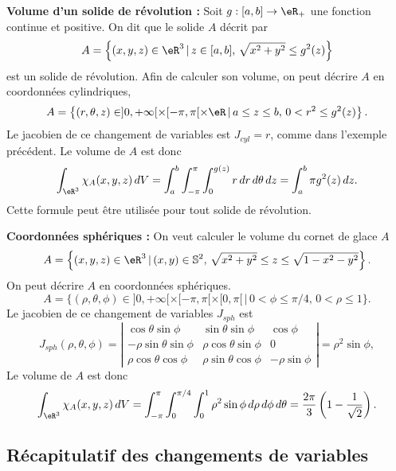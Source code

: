 \begin{example}
\textbf{Volume d'un solide de révolution : }Soit $g:[a,b]\to\eR_+$ une fonction continue et positive. On dit que le solide $A$ décrit par
\[
A=\left\{(x,y,z)\in\eR^3\, \vert \, z\in[a,b], \,\sqrt{x^2+y^2}\leq g^2(z) \right\}
\]
est un solide de révolution. Afin de calculer son volume, on peut décrire $A$ en coordonnées cylindriques, 
\[
A=\left\{(r,\theta,z) \in ]0, +\infty[\times [-\pi,\pi[\times \eR\,\vert\, a\leq z\leq b, \, 0<r^2\leq g^2(z) \right\}.
\]
Le jacobien de ce changement de variables est  $J_{cyl}=r$, comme dans l'exemple précédent. Le volume de $A$ est donc
\[
\int_{\eR^3}\chi_{A}(x,y,z)\, dV=\int_a^{b}\int_{-\pi}^{\pi}\int_{0}^{g(z)} r  \,dr\,d\theta\, dz=\int_a^{b} \pi g^2(z) \, dz.
\] 
Cette formule peut être utilisée pour tout solide de révolution. 
\end{example}

\begin{example}
\textbf{Coordonnées sphériques : }On veut calculer le volume du cornet de glace  $A$ 
\[
A=\left\{(x,y,z)\in\eR^3\, \vert \, (x,y)\in \mathbb{S}^2, \,\sqrt{x^2+y^2}\leq z\leq \sqrt{1-x^2-y^2} \right\}. 
\]
On peut décrire $A$ en coordonnées sphériques. 
\[
A=\{(\rho,\theta,\phi) \in ]0, +\infty[\times [-\pi,\pi[\times [0,\pi[\,\vert\, 0<\phi\leq\pi/4, \, 0<\rho\leq 1 \}.
\]
Le jacobien de ce changement de variables  $J_{sph}$ est
\begin{equation}
 J_{sph}(\rho, \theta, \phi)= \left\vert\begin{array}{ccc}
\cos \theta \sin\phi & \sin \theta\sin\phi & \cos\phi\\
-\rho\sin \theta\sin\phi  & \rho\cos \theta\sin\phi & 0 \\
\rho\cos\theta\cos\phi&\rho\sin\theta\cos\phi& -\rho\sin\phi
\end{array}\right\vert= \rho^2\sin\phi,
\end{equation}
Le volume de $A$ est donc
\[
\int_{\eR^3}\chi_{A}(x,y,z)\, dV=\int_{-\pi}^{\pi}\int_0^{\pi/4}\int_{0}^{1}\rho^2\sin\phi \,d\rho\,d\phi\,d\theta=\frac{2\pi}{3}\left(1-\frac{1}{\sqrt{2}}\right).  
\] 
\end{example}

\subsection{Récapitulatif des changements de variables}

